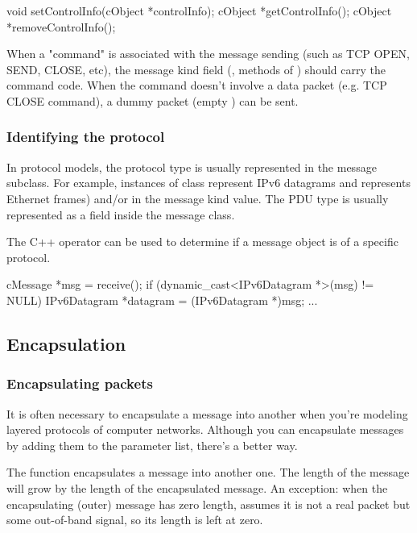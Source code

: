 \begin{cpp}
void setControlInfo(cObject *controlInfo);
cObject *getControlInfo();
cObject *removeControlInfo();
\end{cpp}

When a "command" is associated with the message sending (such as
TCP OPEN, SEND, CLOSE, etc), the message kind field (,
 methods of ) should carry the command code.
When the command doesn't involve a data packet (e.g.
TCP CLOSE command), a dummy packet (empty ) can be sent.



\subsubsection{Identifying the protocol}

In {\opp} protocol models, the protocol type is usually represented
in the message subclass. For example, instances of class
 represent IPv6 datagrams and 
represents Ethernet frames) and/or in the message kind value.
The PDU type is usually represented as a field inside the message class.

The C++  operator can be used to determine
if a message object is of a specific protocol.

\begin{cpp}
cMessage *msg = receive();
if (dynamic_cast<IPv6Datagram *>(msg) != NULL)
{
    IPv6Datagram *datagram = (IPv6Datagram *)msg;
    ...
}
\end{cpp}


\subsection{Encapsulation}

\subsubsection{Encapsulating packets}

It is often necessary to encapsulate a
message into another when you're modeling
layered protocols of computer networks. Although you can encapsulate
messages by adding them to the parameter list, there's a better way.


The  function encapsulates a message
into another one. The length of the message will grow by the length of
the encapsulated message. An exception: when the encapsulating (outer)
message has zero length, {\opp} assumes it is not a real packet but
some out-of-band signal, so its length is left at zero.


